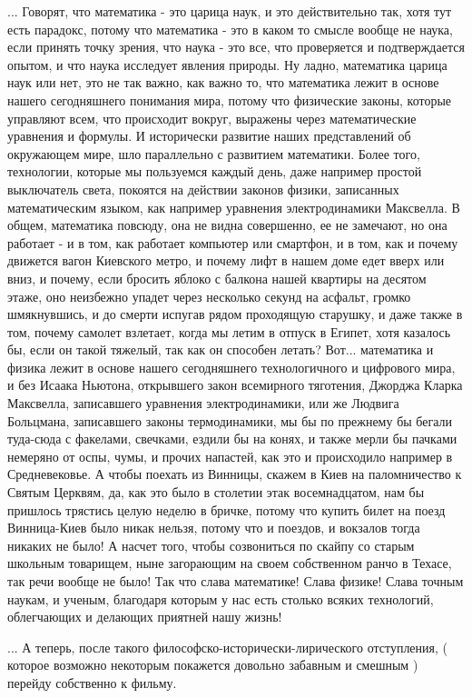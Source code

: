 ... Говорят, что математика - это царица наук, и это действительно так, хотя
тут есть парадокс, потому что математика - это в каком то смысле вообще не
наука, если принять точку зрения, что наука - это все, что проверяется и
подтверждается опытом, и что наука исследует явления природы. Ну ладно,
математика царица наук или нет, это не так важно, как важно то, что математика
лежит в основе нашего сегодняшнего понимания мира, потому что физические
законы, которые управляют всем, что происходит вокруг, выражены через
математические уравнения и формулы. И исторически развитие наших представлений
об окружающем мире, шло параллельно с развитием математики.  Более того,
технологии, которые мы пользуемся каждый день, даже например простой
выключатель света, покоятся на действии законов физики, записанных
математическим языком, как например уравнения электродинамики Максвелла.  В
общем, математика повсюду, она не видна совершенно, ее не замечают, но она
работает - и в том, как работает компьютер или смартфон, и в том, как и почему
движется вагон Киевского метро, и почему лифт в нашем доме едет вверх или вниз,
и почему, если бросить яблоко с балкона нашей квартиры на десятом этаже, оно
неизбежно упадет через несколько секунд на асфальт, громко шмякнувшись, и до
смерти испугав рядом проходящую старушку, и даже также в том, почему самолет
взлетает, когда мы летим в отпуск в Египет, хотя казалось бы, если он такой
тяжелый, так как он способен летать? Вот... математика и физика лежит в основе
нашего сегодняшнего технологичного и цифрового мира, и без Исаака Ньютона,
открывшего закон всемирного тяготения, Джорджа Кларка Максвелла, записавшего
уравнения электродинамики, или же Людвига Больцмана, записавшего законы
термодинамики, мы бы по прежнему бы бегали туда-сюда с факелами, свечками,
ездили бы на конях, и также мерли бы пачками немеряно от оспы, чумы, и прочих
напастей, как это и происходило например в Средневековье. А чтобы поехать из
Винницы, скажем в Киев на паломничество к Святым Церквям, да, как это было в
столетии этак восемнадцатом, нам бы пришлось трястись целую неделю в бричке,
потому что купить билет на поезд Винница-Киев было никак нельзя, потому что и
поездов, и вокзалов тогда никаких не было! А насчет того, чтобы созвониться по
скайпу со старым школьным товарищем, ныне загорающим на своем собственном ранчо
в Техасе, так речи вообще не было! Так что слава математике! Слава физике!
Слава точным наукам, и ученым, благодаря которым у нас есть столько всяких
технологий, облегчающих и делающих приятней нашу жизнь!

... А теперь, после такого философско-исторически-лирического отступления, (
которое возможно некоторым покажется довольно забавным и смешным ) перейду
собственно к фильму.
